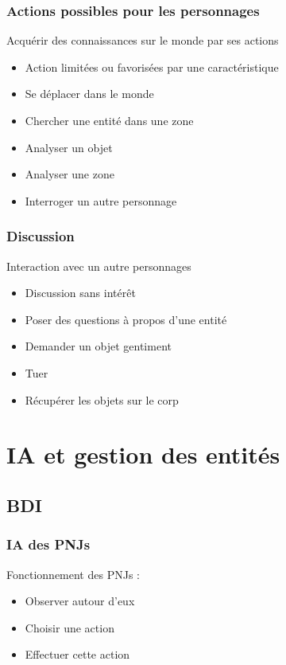 \documentclass{beamer}
\begin{document}
\begin{frame}
      \frametitle{Actions possibles pour les personnages}
      
    \begin{block}{Acquérir des connaissances sur le monde par ses actions}
    \begin{itemize}
    \item Action limitées ou favorisées par une caractéristique
        \item Se déplacer dans le monde
        \item Chercher une entité dans une zone
        \item Analyser un objet
        \item Analyser une zone
        \item Interroger un autre personnage
    \end{itemize} 
    \end{block}
\end{frame}

\begin{frame}
    \frametitle{Discussion}
    \begin{block}{Interaction avec un autre personnages}
      \begin{itemize}
          \item Discussion sans intérêt
          \item Poser des questions à propos d'une entité
          \item Demander un objet gentiment
          \item Tuer
          \item Récupérer les objets sur le corp
      \end{itemize} 
    \end{block}
\end{frame}

\author{GUINGOIN Sylvain}
\section{IA et gestion des entités}

\subsection{BDI}
\begin{frame}
  \frametitle{IA des PNJs}
  Fonctionnement des PNJs :
  \begin{itemize}
  \item Observer autour d'eux
  \item Choisir une action
  \item Effectuer cette action
  \end{itemize}
  ~\\  
\end{frame}
\end{document}

